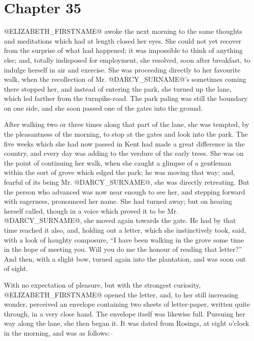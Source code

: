 \chapter*{Chapter 35}


@ELIZABETH_FIRSTNAME@ awoke the next morning to the same thoughts and meditations
which had at length closed her eyes. She could not yet recover from the
surprise of what had happened; it was impossible to think of anything
else; and, totally indisposed for employment, she resolved, soon after
breakfast, to indulge herself in air and exercise. She was proceeding
directly to her favourite walk, when the recollection of Mr. @DARCY_SURNAME@'s
sometimes coming there stopped her, and instead of entering the park,
she turned up the lane, which led farther from the turnpike-road. The
park paling was still the boundary on one side, and she soon passed one
of the gates into the ground.

After walking two or three times along that part of the lane, she was
tempted, by the pleasantness of the morning, to stop at the gates and
look into the park. The five weeks which she had now passed in Kent had
made a great difference in the country, and every day was adding to the
verdure of the early trees. She was on the point of continuing her walk,
when she caught a glimpse of a gentleman within the sort of grove which
edged the park; he was moving that way; and, fearful of its being Mr.
@DARCY_SURNAME@, she was directly retreating. But the person who advanced was now
near enough to see her, and stepping forward with eagerness, pronounced
her name. She had turned away; but on hearing herself called, though
in a voice which proved it to be Mr. @DARCY_SURNAME@, she moved again towards the
gate. He had by that time reached it also, and, holding out a letter,
which she instinctively took, said, with a look of haughty composure,
``I have been walking in the grove some time in the hope of meeting you.
Will you do me the honour of reading that letter?'' And then, with a
slight bow, turned again into the plantation, and was soon out of sight.

With no expectation of pleasure, but with the strongest curiosity,
@ELIZABETH_FIRSTNAME@ opened the letter, and, to her still increasing wonder,
perceived an envelope containing two sheets of letter-paper, written
quite through, in a very close hand. The envelope itself was likewise
full. Pursuing her way along the lane, she then began it. It was dated
from Rosings, at eight o'clock in the morning, and was as follows:--

